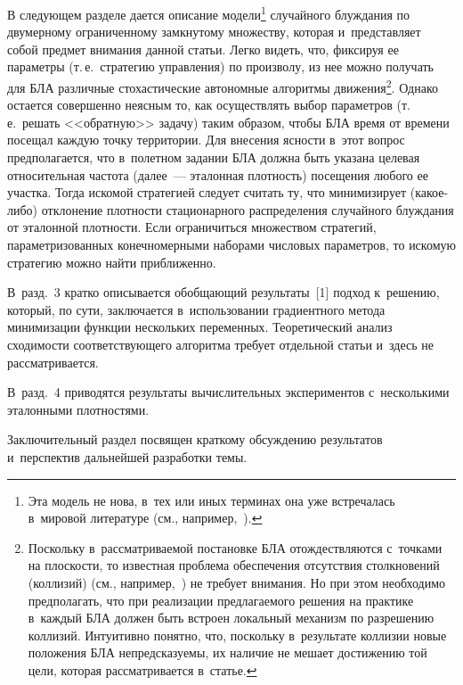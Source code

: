 \begin{multicols}{2}
  В следующем разделе дается описание модели\footnote{ Эта модель не нова, 
  в~тех или иных терминах она уже встречалась в~мировой литературе (см., 
например,~\cite[section~5]{24-kraz}).} случайного блуж\-да\-ния по двумерному 
ограниченному замкнутому множеству, которая и~пред\-став\-ля\-ет собой 
пред\-мет внимания данной \mbox{статьи}. Легко видеть, что, фиксируя ее па\-ра\-мет\-ры 
(т.\,е.\ стратегию управ\-ле\-ния) по произволу, из нее можно получать для БЛА 
различные сто\-ха\-сти\-че\-ские автономные алгоритмы 
движения\footnote{Поскольку в~рассматриваемой постановке БЛА отождествляются 
с~точками на плос\-кости, то известная проб\-ле\-ма обеспечения отсутствия столкновений (коллизий) 
(см., 
 например,~\cite{25-kraz}) не требует внимания. Но при этом необходимо предполагать, что при 
реализации предлагаемого решения на практике в~каждый БЛА должен быть встроен локальный 
механизм по разрешению коллизий. Интуитивно понятно, что, поскольку в~результате коллизии 
новые положения БЛА непредсказуемы, их наличие не мешает достижению той цели, которая 
рас\-смат\-ри\-ва\-ет\-ся в~статье.}. Однако остается совершенно неясным то, как 
осуществлять выбор па\-ра\-мет\-ров (т.\,е.\ решать <<обратную>> задачу) таким 
образом, чтобы БЛА время от времени посещал каж\-дую точ\-ку территории. 
Для внесения яс\-ности в~этот вопрос предполагается, что в~полетном задании 
БЛА должна быть указана целевая относительная час\-то\-та (далее~--- эталонная 
плот\-ность) посещения любого ее участ\-ка. Тогда искомой стратегией следует 
считать ту, что минимизирует (ка\-кое-ли\-бо) отклонение плот\-ности 
стационарного распределения случайного блуж\-да\-ния от эталонной 
плот\-ности. Если ограничиться множеством стратегий, параметризованных 
конечномерными наборами чис\-ло\-вых па\-ра\-мет\-ров, то ис\-ко\-мую стратегию 
можно най\-ти приближенно. 

В~разд.~3 крат\-ко описывается обоб\-ща\-ющий 
результаты~[1] подход к~решению, который, по сути, заключается 
в~использовании градиентного метода минимизации функции нескольких 
переменных. Тео\-ре\-ти\-че\-ский анализ схо\-ди\-мости со\-от\-вет\-ст\-ву\-юще\-го алгоритма 
требует отдельной статьи и~здесь не рас\-смат\-ри\-ва\-ет\-ся.

 В~разд.~4 приводятся 
результаты вы\-чис\-ли\-тель\-ных экспериментов с~несколькими эталонными 
плотностями. 

За\-клю\-чи\-тель\-ный раз\-дел по\-свя\-щен краткому об\-суж\-де\-нию 
результатов и~перспектив дальнейшей раз\-ра\-бот\-ки темы. 
  

\end{multicols}
